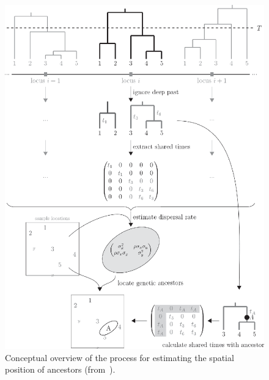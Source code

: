 \documentclass[12pt]{article}
\begin{document}
\begin{figure}
  \begin{center}
    \includegraphics[width=14cm]{sparg-overview.eps}
  \end{center}
  \caption{Conceptual overview of the process for estimating the
    spatial position of ancestors
    (from~\cite{Osmond-Coop-2021}).}\label{fig:sparg-overview} 
\end{figure}
\end{document}
